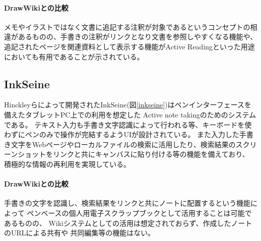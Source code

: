 \paragraph*{DrawWikiとの比較}
メモやイラストではなく文書に追記する注釈が対象であるというコンセプトの相違があるものの、手書きの注釈がリンクとなり文書を参照しやすくなる機能や、
追記されたページを関連資料として表示する機能がActive Readingといった用途においても有用であることが示されている。

\subsection{InkSeine}
Hinckleyらによって開発されたInkSeine\cite{Hinckley2007InkSeineIS}(図\ref{inkseine})はペンインターフェースを備えたタブレットPC上での利用を想定した
Active note takingのためのシステムである。
テキスト入力も手書き文字認識によって行われる等、キーボードを使わずにペンのみで操作が完結するようUIが設計されている。
また入力した手書き文字をWebページやローカルファイルの検索に活用したり、検索結果のスクリーンショットをリンクと共にキャンバスに貼り付ける等の機能を備えており、
積極的な情報の再利用を実現している。

\paragraph*{DrawWikiとの比較}
手書きの文字を認識し、検索結果をリンクと共にノートに配置するという機能によって
ペンベースの個人用電子スクラップブックとして活用することは可能であるものの、
Wikiシステムとしての活用は想定されておらず、作成したノートのURLによる共有や
共同編集等の機能はない。

